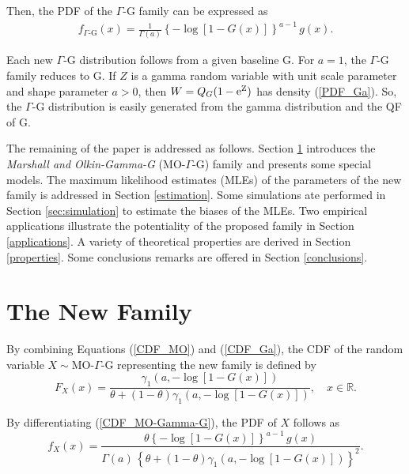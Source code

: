 \documentclass[12pt,a4paper]{article} %
\begin{document}
Then, the PDF of the $\Gamma$-G family can be expressed as
\begin{eqnarray}\label{PDF_Ga}
\displaystyle
f_{\Gamma\text{-G}}(x)=\frac{\displaystyle 1}{\displaystyle \Gamma(a)} \left\{ -\log[1-G(x)] \right\}^{a-1}\, g(x).
\end{eqnarray}

Each new $\Gamma$-G distribution follows from a given baseline G.
For $a=1$, the $\Gamma$-G family reduces to G.
If $Z$ is a gamma random variable with unit scale
parameter and shape parameter $a>0$, then $W=Q_G(1-\rm{e}^{Z})$ has density (\ref{PDF_Ga}). So,
the $\Gamma$-G distribution is easily generated from the gamma distribution and the QF of G.




The remaining of the paper is addressed as follows. Section \ref{sec:MOGaG} introduces the {\it Marshall and Olkin-Gamma-G} (MO-$\Gamma$-G)
family and presents some special models. The maximum likelihood estimates (MLEs) of the parameters of the new family is addressed
in Section \ref{estimation}. Some simulations ate performed in Section \ref{sec:simulation} to estimate the biases of the MLEs. Two
empirical applications illustrate the potentiality of the proposed family in Section \ref{applications}. A variety of theoretical properties are derived
in Section \ref{properties}. Some conclusions remarks are offered in Section \ref{conclusions}.


\section{The New Family}\label{sec:MOGaG}


By combining Equations (\ref{CDF_MO}) and (\ref{CDF_Ga}), the CDF of the random variable $X\sim$MO-$\Gamma$-G
representing the new family is defined by
\begin{equation}\label{CDF_MO-Gamma-G}
F_{X}(x)=\frac{\gamma_1\left( a, -\log \left[1-G(x)\right]\right)}{\theta+(1-\theta)\gamma_1\left( a, -\log \left[1-G(x)\right]\right)},\quad x \in \mathbb{R}.
\end{equation}

By differentiating (\ref{CDF_MO-Gamma-G}), the PDF of $X$ follows as
\begin{equation}\label{PDF_MO-Gamma-G}
f_{X}(x)=\frac{\theta  \left\{ -\log[1-G(x)] \right\}^{a-1}\, g(x)}{\Gamma(a)\,\left\{\theta+(1-\theta)\gamma_1\left( a, -\log \left[1-G(x)\right]\right)\right\}^{2}}.
\end{equation}
\end{document}
